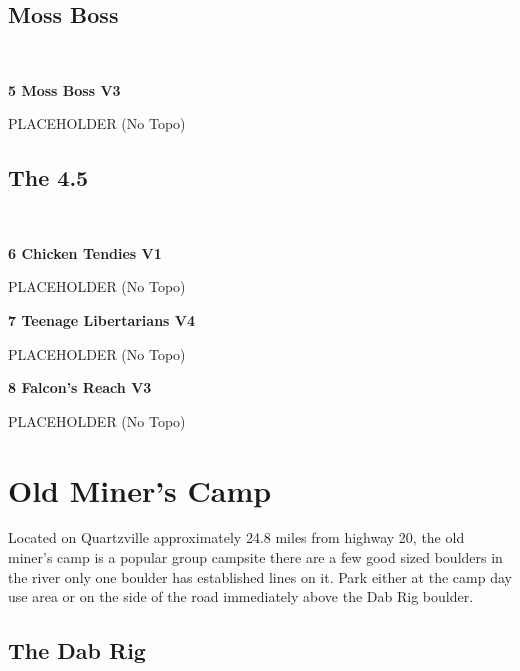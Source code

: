 \begin{multicols*}{2}
			\subsection*{Moss Boss}\label{bf:Moss Boss}
			\
			
					\label{rt:Moss Boss} \colorbox{green!20}{\textbf{5 Moss Boss V3   }}
					\begin{adjustwidth}{1cm}{}
					PLACEHOLDER
						\newline (No Topo) 
					\end{adjustwidth}
			\subsection*{The 4.5}\label{bf:The 4.5}
			\
			
					\label{rt:Chicken Tendies} \colorbox{green!20}{\textbf{6 Chicken Tendies V1 \ding{72}  }}
					\begin{adjustwidth}{1cm}{}
					PLACEHOLDER
						\newline (No Topo) 
					\end{adjustwidth}
					\label{rt:Teenage Libertarians} \colorbox{RoyalBlue!20}{\textbf{7 Teenage Libertarians V4     }}
					\begin{adjustwidth}{1cm}{}
					PLACEHOLDER
						\newline (No Topo) 
					\end{adjustwidth}
					\label{rt:Falcon's Reach} \colorbox{green!20}{\textbf{8 Falcon's Reach V3 \ding{72}  }}
					\begin{adjustwidth}{1cm}{}
					PLACEHOLDER
						\newline (No Topo) 
					\end{adjustwidth}
		\section{Old Miner's Camp}\label{sa:Old Miner's Camp}
	Located on Quartzville approximately 24.8 miles from highway 20, the old miner's camp is a popular group campsite there are a few good sized boulders in the river only one boulder has established lines on it. Park either at the camp day use area or on the side of the road immediately above the Dab Rig boulder.
			\subsection*{The Dab Rig}\label{bf:The Dab Rig}
			\
			

\end{multicols*}
